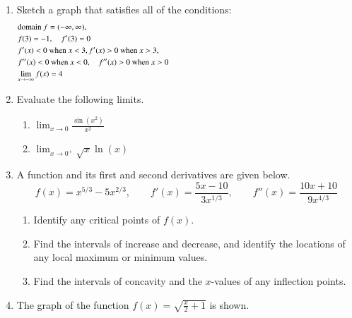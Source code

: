 \documentclass[12pt]{article}
\begin{document}
\begin{enumerate}
\item Sketch a graph that satisfies all of the conditions:
\begin{align*}
  &\text{domain } f = (-\infty,\infty), \hspace{5.0in}\\
  &f(3)=-1, \quad f'(3)=0  \\
  & f'(x)<0 \text{ when } x<3,f'(x)>0 \text{ when } x > 3,  \\
  &f''(x)<0 \text{ when } x<0, \quad f''(x)>0 \text{ when } x>0 \\
  &\displaystyle{\lim_{x \to -\infty} f(x)=4}\\
\end{align*}

\item Evaluate the following limits.
\begin{enumerate}
\item $\lim_{x \to 0} \frac{\sin(x^2)}{x^2}$
\item $\lim_{x \to 0^+} \sqrt{x} \ln(x)$
\end{enumerate}

\item A function and its first and second derivatives are given below.
$$f(x)=x^{5/3}-5x^{2/3}, \quad \quad f'(x)=\frac{5x-10}{3x^{1/3}}, \quad \quad f''(x)=\frac{10x+10}{9x^{4/3}}$$
\begin{enumerate}
\item Identify any critical points of $f(x).$
\item Find the intervals of increase and decrease, and identify the locations of any local maximum or minimum values.
\item Find the intervals of concavity and the $x$-values of any inflection points.
\end{enumerate}

\item The graph of the function $\displaystyle f(x) = \sqrt{\frac{x}{2}+1}$ is shown.



\end{enumerate}
\end{document}
